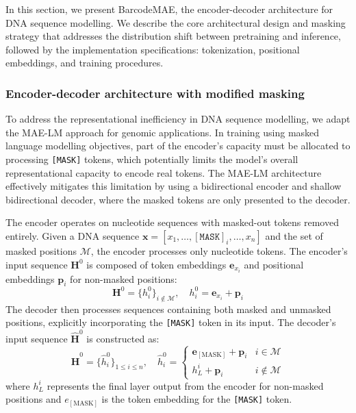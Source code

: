 In this section, we present BarcodeMAE, the encoder-decoder architecture for DNA sequence modelling. We describe the core architectural design and masking strategy that addresses the distribution shift between pretraining and inference, followed by the implementation specifications: tokenization, positional embeddings, and training procedures.

\subsubsection{Encoder-decoder architecture with modified masking}

To address the representational inefficiency in DNA sequence modelling, we adapt the MAE-LM approach \citep{meng2024maelm} for genomic applications.
In training using masked language modelling objectives, part of the encoder's capacity must be allocated to processing \texttt{[MASK]} tokens, which potentially limits the model's overall representational capacity to encode real tokens. The MAE-LM architecture effectively mitigates this limitation by using a bidirectional encoder and shallow bidirectional decoder, where the masked tokens are only presented to the decoder.


The encoder operates on nucleotide sequences with masked-out tokens removed entirely. Given a DNA sequence $\mathbf{x} = [x_1, \ldots, [\texttt{MASK}]_i, \ldots, x_n]$ and the set of masked positions $\mathcal{M}$, the encoder processes only nucleotide tokens. The encoder's input sequence $\mathbf{H}^0$ is composed of token embeddings $\mathbf{e}_{x_i}$ and positional embeddings $\mathbf{p}_i$ for non-masked positions:
\begin{equation}
\mathbf{H}^0 = \{h_i^0\}_{i\notin\mathcal{M}}, \quad h_i^0 = \mathbf{e}_{x_i} + \mathbf{p}_i
\end{equation}
The decoder then processes sequences containing both masked and unmasked positions, explicitly incorporating the \texttt{[MASK]} token in its input. The decoder's input sequence $\hat{\mathbf{H}}^0$ is constructed as:
\begin{equation}
\hat{\mathbf{H}}^0 = \{\hat{h}_i^0\}_{1\leq i\leq n}, \quad
\hat{h}_i^0 = \begin{cases}
\mathbf{e}_{[\text{MASK}]} + \mathbf{p}_i & i \in \mathcal{M} \\
h_L^i + \mathbf{p}_i & i \notin \mathcal{M}
\end{cases}
\end{equation}
where $h_L^i$ represents the final layer output from the encoder for non-masked positions and ${e}_{[\text{MASK}]}$ is the token embedding for the \texttt{[MASK]} token. 


